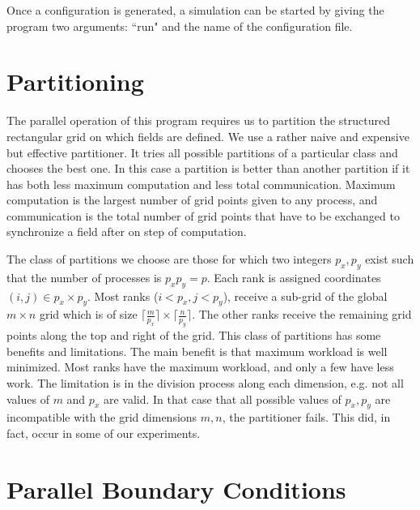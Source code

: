 \documentclass[twocolumn]{article}
\begin{document}
Once a configuration is generated, a simulation can be started
by giving the program two arguments: ``run" and the name of the
configuration file.

\section{Partitioning}

The parallel operation of this program requires us to partition
the structured rectangular grid on which fields are defined.
We use a rather naive and expensive but effective partitioner.
It tries all possible partitions of a particular class
and chooses the best one.
In this case a partition is better than another partition
if it has both less maximum computation and less
total communication.
Maximum computation is the largest number of grid points given to
any process, and communication is the total number of grid points
that have to be exchanged to synchronize a field after on step
of computation.

The class of partitions we choose are those for which two integers
$p_x,p_y$ exist such that the number of processes is $p_xp_y=p$.
Each rank is assigned coordinates $(i,j)\in p_x\times p_y$.
Most ranks ($i<p_x,j<p_y$), receive a sub-grid of the global
$m\times n$ grid which is of size
$\lceil\frac{m}{p_x}\rceil\times \lceil\frac{n}{p_y}\rceil$.
The other ranks receive the remaining grid points along the top
and right of the grid.
This class of partitions has some benefits and limitations.
The main benefit is that maximum workload is well minimized.
Most ranks have the maximum workload, and only a few have less work.
The limitation is in the division process along each dimension,
e.g. not all values of $m$ and $p_x$ are valid.
In that case that all possible values of $p_x,p_y$ are incompatible with
the grid dimensions $m,n$, the partitioner fails.
This did, in fact, occur in some of our experiments.

\section{Parallel Boundary Conditions}
\end{document}

